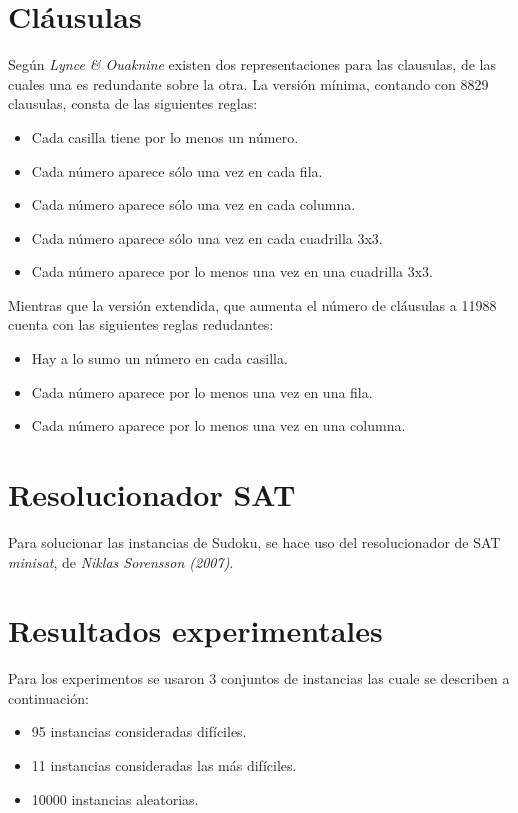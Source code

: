 \documentclass{article}
\begin{document}
\section*{Cláusulas}

Según \emph{Lynce \& Ouaknine} existen dos representaciones para las clausulas, de las cuales una es redundante sobre la otra. La versión mínima, contando con 8829 clausulas, consta de las siguientes reglas:

\begin{itemize}
    \item Cada casilla tiene por lo menos un número.
    \item Cada número aparece sólo una vez en cada fila.
    \item Cada número aparece sólo una vez en cada columna.
    \item Cada número aparece sólo una vez en cada cuadrilla 3x3.
    \item Cada número aparece por lo menos una vez en una cuadrilla 3x3.
\end{itemize}

Mientras que la versión extendida, que aumenta el número de cláusulas a 11988 cuenta con las siguientes reglas redudantes:

\begin{itemize}
    \item Hay a lo sumo un número en cada casilla.
    \item Cada número aparece por lo menos una vez en una fila.
    \item Cada número aparece por lo menos una vez en una columna.
\end{itemize}

\section*{Resolucionador SAT}

Para solucionar las instancias de Sudoku, se hace uso del resolucionador de SAT \emph{minisat}, de \emph{Niklas Sorensson (2007)}.

\section*{Resultados experimentales}

Para los experimentos se usaron 3 conjuntos de instancias las cuale se describen a continuación:

\begin{itemize}
    \item 95 instancias consideradas difíciles.
    \item 11 instancias consideradas las más difíciles.
    \item 10000 instancias aleatorias.
\end{itemize}
\end{document}
